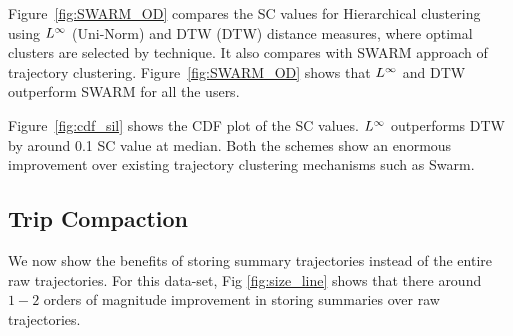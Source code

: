 Figure~\ref{fig:SWARM_OD} compares the SC values for Hierarchical clustering using $L^\infty$ (Uni-Norm) and DTW (DTW) distance measures, where optimal clusters are selected by \modal technique. It also compares with SWARM approach of trajectory clustering. Figure~\ref{fig:SWARM_OD} shows that $L^\infty$ and DTW outperform SWARM for all the users. 

Figure~\ref{fig:cdf_sil} shows the CDF plot of the SC values. $L^\infty$ outperforms DTW by around 0.1 SC value at median. Both the schemes show an enormous improvement over existing trajectory clustering mechanisms such as Swarm.

\subsection{Trip Compaction}
We now show the benefits of storing summary trajectories instead of the entire raw trajectories. For this data-set, Fig \ref{fig:size_line} shows that there around $1-2$ orders of magnitude improvement in storing summaries over raw trajectories.

